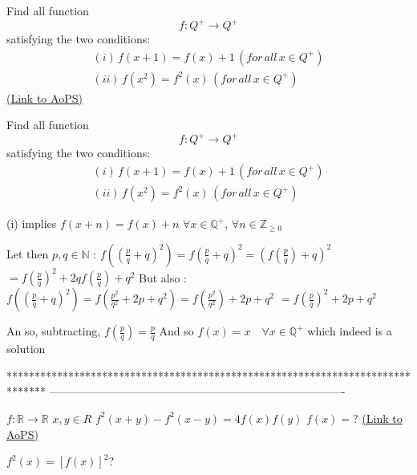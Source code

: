 \begin{problem}
	Find all function \[f:{Q^ + } \to {Q^ + }\] satisfying the two conditions:
\[\begin{array}{l}
(i)\,f(x + 1) = f(x) + 1\,(for\,all\,x \in {Q^ + })\\
(ii)\,f({x^2}) = {f^2}(x)\,(for\,all\,x \in {Q^ + })
\end{array}\]
	\flushright \href{https://artofproblemsolving.com/community/c6h1602721}{(Link to AoPS)}
\end{problem}



\begin{solution}
	\begin{tcolorbox}Find all function \[f:{Q^ + } \to {Q^ + }\] satisfying the two conditions:
\[\begin{array}{l}
(i)\,f(x + 1) = f(x) + 1\,(for\,all\,x \in {Q^ + })\\
(ii)\,f({x^2}) = {f^2}(x)\,(for\,all\,x \in {Q^ + })
\end{array}\]\end{tcolorbox}
(i) implies $f(x+n)=f(x)+n$ $\forall x\in\mathbb Q^+$, $\forall n\in\mathbb Z_{\ge 0}$

Let then $p,q\in\mathbb N$ :
$f((\frac pq+q)^2)=f(\frac pq+q)^2=(f(\frac pq)+q)^2$ $=f(\frac pq)^2+2qf(\frac pq)+q^2$
But also :
$f((\frac pq+q)^2)=f(\frac{p^2}{q^2}+2p+q^2)=f(\frac{p^2}{q^2})+2p+q^2$ $=f(\frac pq)^2+2p+q^2$

An so, subtracting, $f(\frac pq)=\frac pq$
And so $\boxed{f(x)=x\quad\forall x\in\mathbb Q^+}$ which indeed is a solution


\end{solution}
*******************************************************************************
-------------------------------------------------------------------------------

\begin{problem}
	$f:\mathbb{R} \to \mathbb{R}$ $x,y\in R$
$f^2(x+y)-f^2(x-y)=4f(x)f(y)$
$f(x)=?$
	\flushright \href{https://artofproblemsolving.com/community/c6h1602747}{(Link to AoPS)}
\end{problem}



\begin{solution}
	$f^2(x) = [f(x)]^2$?
\end{solution}



